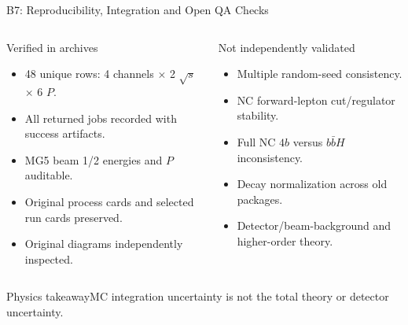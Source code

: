 \documentclass[aspectratio=1610,english]{beamer}
\newcommand{\src}[1]{\vfill{\par\color{black!65}\fontsize{6.4}{7.4}\selectfont\emph{Source:} #1\par}}
\newcommand{\key}[1]{\begin{alertblock}{Physics takeaway}\small  #1\end{alertblock}}
\begin{document}
\begin{frame}[t]{B7: Reproducibility, Integration and Open QA Checks}
\footnotesize

\begin{columns}%
\begin{exampleblock}{Verified in archives}
\begin{itemize}
\justifying
\item 48 unique rows: 4 channels $\times$ 2 $\sqrt{s}$ $\times$ 6 $P$.
\item All returned jobs recorded with success artifacts.
\item MG5 beam 1/2 energies and $P$ auditable.
\item Original process cards and selected run cards preserved.
\item Original diagrams independently inspected.
\end{itemize}\end{exampleblock}
\begin{alertblock}{Not independently validated}
\begin{itemize}
\justifying
\item Multiple random-seed consistency.
\item NC forward-lepton cut/regulator stability.
\item Full NC $4b$ versus $b\bar bH$ inconsistency.
\item Decay normalization across old packages.
\item Detector/beam-background and higher-order theory.
\end{itemize}\end{alertblock}
\end{columns}
\key{MC integration uncertainty is not the total theory or detector uncertainty.}

\end{frame}
\end{document}
